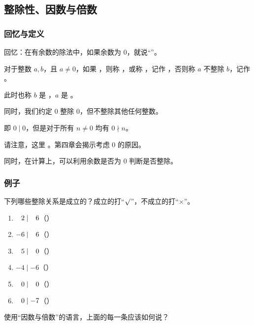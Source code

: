 \subsection{整除性、因数与倍数}
\begin{frame}[c]
  \progressnow*
\end{frame}
\begin{frame}
  \frametitle{回忆与定义}
  回忆：在有余数的除法中，如果余数为 $0$，就说“”。
  \pause
  \begin{definition}[整除、因数与倍数]
    对于整数 $a, b$，且 $a \ne 0$，如果 ，则称 ，或称 ，记作 ，否则称 $a$ 不整除 $b$，记作 。
   
    \emptyline
    此时也称 $b$ 是 ，$a$ 是 。
    \pause
    
    \emptyline
    同时，我们\alert{约定} $0$ 整除 $0$，但不整除其他任何整数。
    
    即 $0 \mid 0$，但是对于所有 $n \ne 0$ 均有 $0 \nmid n$。
  \end{definition}
  \pause
  请注意，这里 。第四章会揭示考虑 $0$ 的原因。
  \pause
  
  \emptyline
  同时，在计算上，可以利用余数是否为 $0$ 判断是否整除。
\end{frame}
\begin{frame}
  \frametitle{例子}
  下列哪些整除关系是成立的？成立的打“$\surd$”，不成立的打“$\times$”。
  \begin{enumerate}
    \item $\hphantom{-{}}2 \mid \hphantom{-{}}6$\hspace{1em}（）
    \item $-6 \mid \hphantom{-{}}6$\hspace{1em}（）
    \item $\hphantom{-{}}5 \mid \hphantom{-{}}0$\hspace{1em}（）
    \item $-4 \mid -6$\hspace{1em}（）
    \item $\hphantom{-{}}0 \mid \hphantom{-{}}0$\hspace{1em}（）
    \item $\hphantom{-{}}0 \mid -7$\hspace{1em}（）
  \end{enumerate}
  \pause\pause\pause\pause\pause\pause\pause
  \emptyline
  使用“因数与倍数”的语言，上面的每一条应该如何说？
\end{frame}

